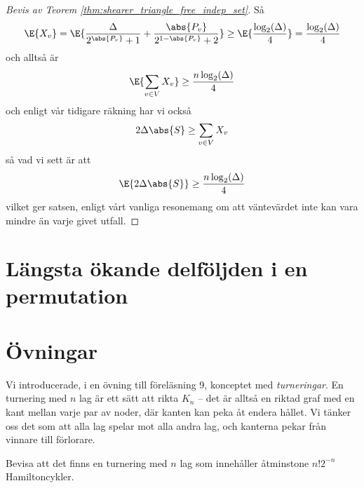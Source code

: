 \documentclass[nobib]{tufte-handout}
\begin{document}
\begin{proof}[Bevis av Teorem \ref{thm:shearer_triangle_free_indep_set}]
  Så
  \begin{align*}
    \E{X_v} = \E{\frac{\Delta}{2^{\abs{P_v}} + 1} + \frac{\abs{P_v}}{2^{1-\abs{P_v}} + 2}} \geq \E{\frac{\log_2(\Delta)}{4}} = \frac{\log_2(\Delta)}{4}
  \end{align*}
  och alltså är
  $$\E{\sum_{v \in V} X_v} \geq \frac{n\log_2(\Delta)}{4}$$
  och enligt vår tidigare räkning har vi också
  $$2\Delta\abs{S} \geq \sum_{v \in V} X_v$$
  så vad vi sett är att
  $$\E{2\Delta\abs{S}} \geq \frac{n\log_2(\Delta)}{4}$$
  vilket ger satsen, enligt vårt vanliga resonemang om att väntevärdet inte kan vara mindre än varje givet utfall.
\end{proof}

\section{Längsta ökande delföljden i en permutation}

\section{Övningar}

\begin{xca}
  Vi introducerade, i en övning till föreläsning 9, konceptet med \emph{turneringar}. En turnering med $n$ lag är ett sätt att rikta $K_n$ -- det är alltså en riktad graf med en kant mellan varje par av noder, där kanten kan peka åt endera hållet. Vi tänker oss det som att alla lag spelar mot alla andra lag, och kanterna pekar från vinnare till förlorare.

  Bevisa att det finns en turnering med $n$ lag som innehåller åtminstone $n!2^{-n}$ Hamiltoncykler.
\end{xca}

%
%
\end{document}
